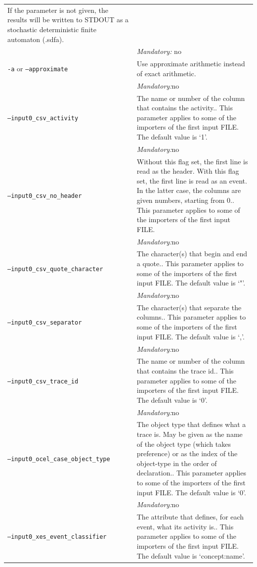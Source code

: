 {\begin{tabularx}{\linewidth}{lX}
If the parameter is not given, the results will be written to STDOUT as a stochastic deterministic finite automaton (.sdfa).\\
&\textit{Mandatory:} \quad no\\
\texttt{-a} or \texttt{--approximate} & Use approximate arithmetic instead of exact arithmetic.\\
&\textit{Mandatory:}\quad no\\
\texttt{--input0\_csv\_activity} & The name or number of the column that contains the activity.. This parameter applies to some of the importers of the first input FILE. The default value is `1'.\\
&\textit{Mandatory:}\quad no\\
\texttt{--input0\_csv\_no\_header} & Without this flag set, the first line is read as the header. 
    With this flag set, the first line is read as an event. In the latter case, the columns are given numbers, starting from 0.. This parameter applies to some of the importers of the first input FILE. \\
&\textit{Mandatory:}\quad no\\
\texttt{--input0\_csv\_quote\_character} & The character(s) that begin and end a quote.. This parameter applies to some of the importers of the first input FILE. The default value is `"'.\\
&\textit{Mandatory:}\quad no\\
\texttt{--input0\_csv\_separator} & The character(s) that separate the columns.. This parameter applies to some of the importers of the first input FILE. The default value is `,'.\\
&\textit{Mandatory:}\quad no\\
\texttt{--input0\_csv\_trace\_id} & The name or number of the column that contains the trace id.. This parameter applies to some of the importers of the first input FILE. The default value is `0'.\\
&\textit{Mandatory:}\quad no\\
\texttt{--input0\_ocel\_case\_object\_type} & The object type that defines what a trace is. May be given as the name of the object type (which takes preference) or as the index of the object-type in the order of declaration.. This parameter applies to some of the importers of the first input FILE. The default value is `0'.\\
&\textit{Mandatory:}\quad no\\
\texttt{--input0\_xes\_event\_classifier} & The attribute that defines, for each event, what its activity is.. This parameter applies to some of the importers of the first input FILE. The default value is `concept:name'.\\

\end{tabularx}}
